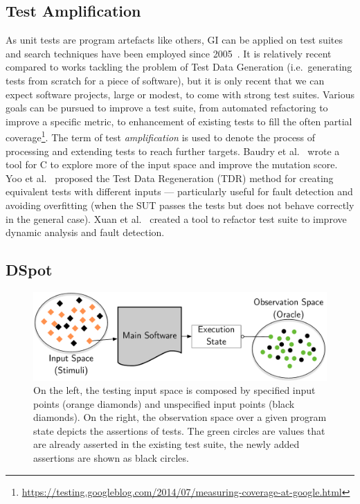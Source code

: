 \documentclass[a4paper,11pt]{sdm_internship}
\newcommand{\CS}{C\nolinebreak\hspace{-.05em}\raisebox{.6ex}{\scriptsize\bf \#}}
\newcommand{\addref}[1]{\colorbox{TealBlue!100}{\textcolor{white}{\textbf{$[$\ifx&#1&\ \else#1\fi$]$}}}}
\newcommand{\dspot}{DSpot\xspace}
\theoremstyle{definition}
\begin{document}
\subsection{Test Amplification}%
\label{ssec:test_amplification}
As unit tests are program artefacts like others, GI can be applied on test suites~\cite{danglot2017emerging} and search techniques have been employed since 2005~\cite{baudry2005automatic}.
It is relatively recent compared to works tackling the problem of Test Data Generation (i.e.\ generating tests from scratch for a piece of software), but it is only recent that we can expect software projects, large or modest, to come with strong test suites.
Various goals can be pursued to improve a test suite, from automated refactoring to improve a specific metric, to enhancement of existing tests to fill the often partial coverage\footnote{\url{https://testing.googleblog.com/2014/07/measuring-coverage-at-google.html}}.
The term of test \emph{amplification} is used to denote the process of processing and extending tests to reach further targets.
Baudry et al.~\cite{baudry2005automatic} wrote a tool for \CS{} to explore more of the input space and improve the mutation score.
Yoo et al.~\cite{yoo2012test} proposed the Test Data Regeneration (TDR) method for creating equivalent tests with different inputs --- particularly useful for fault detection and avoiding overfitting (when the SUT passes the tests but does not behave correctly in the general case).
Xuan et al.~\cite{xuan2015dynamic,xuan2016b} created a tool to refactor test suite to improve dynamic analysis and fault detection.

\subsection{\dspot{}}%
\label{ssec:dspot}

\begin{figure}
  \centering
  \includegraphics[width=36em]{spaces_report}
  \caption{On the left, the testing input space is composed by specified input points (orange diamonds) and unspecified input points (black diamonds). On the right, the observation space over a given program state depicts the assertions of tests. The green circles are values that are already asserted in the existing test suite, the newly added assertions are shown as black circles.}%
\label{fig:spaces}
\end{figure}
\end{document}
